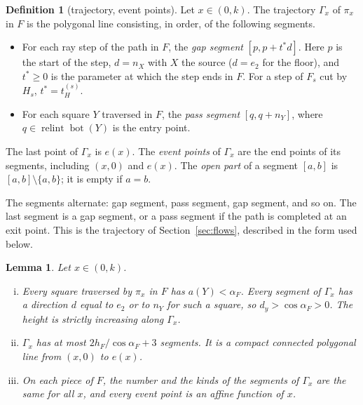\documentclass[11pt]{amsart}
\newcommand{\relint}{\operatorname{relint}}
\newcommand{\Bot}{\operatorname{bot}}
\newcommand{\Fs}{F_{s}}
\newtheorem{lemma}[theorem]{Lemma}
\theoremstyle{definition}
\newtheorem{definition}[theorem]{Definition}
\theoremstyle{remark}
\numberwithin{equation}{section}
\begin{document}
\begin{definition}[trajectory, event points]\label{def:P4-traj}
Let $x\in(0,k)$. The trajectory $\Gamma_x$ of $\pi_x$ in $F$ is the polygonal line consisting, in order, of the following segments.
\begin{itemize}
\item For each ray step of the path in $F$, the \emph{gap segment} $[p,p+t^*d]$. Here $p$ is the start of the step, $d=n_X$ with $X$ the source ($d=e_2$ for the floor), and $t^*\ge0$ is the parameter at which the step ends in $F$. For a step of $\Fs$ cut by $H_s$, $t^*=t^{(s)}_H$.
\item For each square $Y$ traversed in $F$, the \emph{pass segment} $[q,q+n_Y]$, where $q\in\relint\Bot(Y)$ is the entry point.
\end{itemize}
The last point of $\Gamma_x$ is $e(x)$. The \emph{event points} of $\Gamma_x$ are the end points of its segments, including $(x,0)$ and $e(x)$. The \emph{open part} of a segment $[a,b]$ is $[a,b]\setminus\{a,b\}$; it is empty if $a=b$.
\end{definition}

The segments alternate: gap segment, pass segment, gap segment, and so on. The last segment is a gap segment, or a pass segment if the path is completed at an exit point. This is the trajectory of Section~\ref{sec:flows}, described in the form used below.

\begin{lemma}\label{lem:P4-traj}
Let $x\in(0,k)$.
\begin{enumerate}[(i)]
\item Every square traversed by $\pi_x$ in $F$ has $a(Y)<\alpha_F$. Every segment of $\Gamma_x$ has a direction $d$ equal to $e_2$ or to $n_Y$ for such a square, so $d_y>\cos\alpha_F>0$. The height is strictly increasing along $\Gamma_x$.
\item $\Gamma_x$ has at most $2h_F/\cos\alpha_F+3$ segments. It is a compact connected polygonal line from $(x,0)$ to $e(x)$.
\item On each piece of $F$, the number and the kinds of the segments of $\Gamma_x$ are the same for all $x$, and every event point is an affine function of $x$.
\end{enumerate}
\end{lemma}
\end{document}
